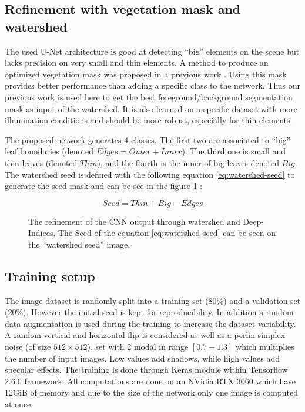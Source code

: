 \documentclass[../thesis.tex]{subfiles}
\begin{document}
    \subsection{Refinement with vegetation mask and watershed}
    \label{sec:watershed-refinement}
    
    
    The used U-Net architecture is good at detecting ``big'' elements on the scene but lacks precision on very small and thin elements.  A method to produce an optimized vegetation mask was proposed in  a previous work  \cite{Vayssade2021}. Using this mask provides better performance than adding a specific class to the network. Thus our previous work is used here to get the best foreground/background segmentation mask as input of the watershed. It is also learned on a specific dataset with more illumination conditions and should be more robust, especially for thin elements.
    
    The proposed network generates 4 classes. The first two are associated to ``big'' leaf boundaries (denoted $Edges=Outer+Inner$). The third one is small and thin leaves (denoted $Thin$), and the fourth is the inner of big leaves denoted $Big$. The watershed seed is defined with the following equation \ref{eq:watershed-seed} to generate the seed mask and can be see in the figure \ref{fig:07-refined-watershed} :
    
    \begin{equation}
    Seed = Thin + Big - Edges
    \label{eq:watershed-seed}
    \end{equation}
    
    \begin{figure}[H]
        \centering
        \vspace{-1em}
        
        \caption{The refinement of the CNN output through watershed and Deep-Indices. The Seed of the equation \ref{eq:watershed-seed} can be seen on the ``watershed seed'' image.}
        \label{fig:07-refined-watershed}
    \end{figure}
    
    \subsection{Training setup}
    
    The image dataset is randomly split into a training set (80\%) and a validation set (20\%). However the initial seed is kept for reproducibility. In addition a random data augmentation is used during the training to increase the dataset variability. A random vertical and horizontal flip is considered as well as a perlin simplex noise \cite{perlin_noise} (of size $512 \times 512$), set with 2 modal in range $[0.7-1.3]$ which multiplies the number of input images. Low values add shadows, while high values add specular effects. The training is done through Keras module within Tensorflow 2.6.0 framework. All computations are done on an NVidia RTX 3060 which have 12GiB of memory and due to the size of the network only one image is computed at once.
    
\end{document}
